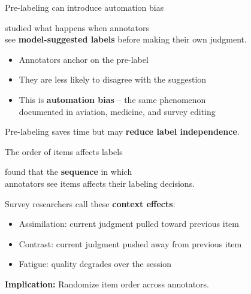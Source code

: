 \documentclass[aspectratio=169,11pt]{beamer}
\begin{document}
\begin{frame}{Pre-labeling can introduce automation bias}

\citet{beck2025pre} studied what happens when annotators\\
see \textbf{model-suggested labels} before making their own judgment.

\vspace{1em}

\begin{itemize}
  \item Annotators anchor on the pre-label
  \item They are less likely to disagree with the suggestion
  \item This is \textbf{automation bias} -- the same phenomenon\\
        documented in aviation, medicine, and survey editing
\end{itemize}

\vspace{1em}

Pre-labeling saves time but may \textbf{reduce label independence}.
\end{frame}

\begin{frame}{The order of items affects labels}

\citet{beck2024order} found that the \textbf{sequence} in which\\
annotators see items affects their labeling decisions.

\vspace{1em}

Survey researchers call these \textbf{context effects}:
\begin{itemize}
  \item Assimilation: current judgment pulled toward previous item
  \item Contrast: current judgment pushed away from previous item
  \item Fatigue: quality degrades over the session
\end{itemize}

\vspace{1em}

\textbf{Implication:} Randomize item order across annotators.
\end{frame}
\end{document}
